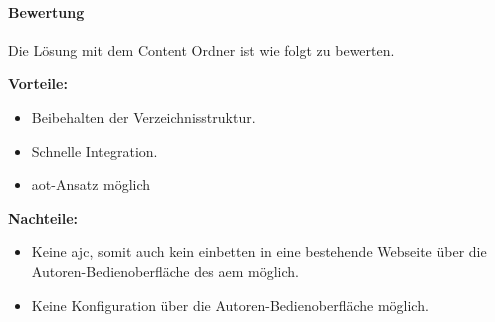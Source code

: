 \paragraph{Bewertung}

Die Lösung mit dem Content Ordner ist wie folgt zu bewerten.

\begin{minipage}[t]{0.5\textwidth}
	\textbf{Vorteile:}
	\begin{itemize}
		\item Beibehalten der Verzeichnisstruktur.
		\item Schnelle Integration.
		\item \ac{aot}-Ansatz möglich
	\end{itemize}
\end{minipage}
\begin{minipage}[t]{0.5\textwidth}
	\textbf{Nachteile:}
	\begin{itemize}
		\item Keine \ac{ajc}, somit auch kein einbetten in eine bestehende Webseite  über die Autoren-Bedienoberfläche des \ac{aem} möglich.
		\item Keine Konfiguration über die Autoren-Bedienoberfläche möglich.
	\end{itemize}
\end{minipage}